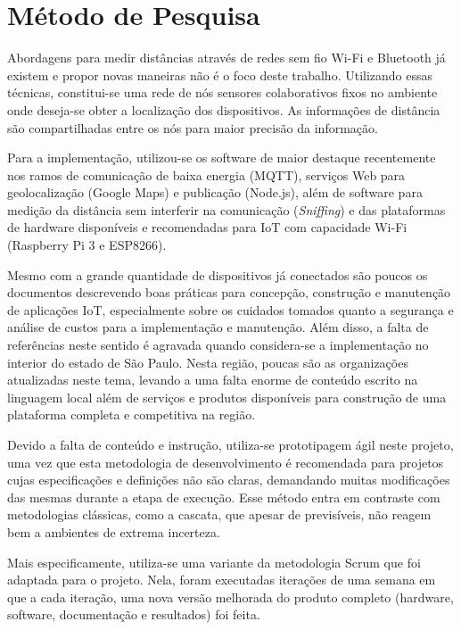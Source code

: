 \chapter{Método de Pesquisa}
\label{chap:Método de Pesquisa}

Abordagens para medir distâncias através de redes sem fio Wi-Fi
\cite{bahillo2009ieee} e Bluetooth já existem e propor novas maneiras
não é o foco deste trabalho. Utilizando essas técnicas, constitui-se uma
rede de nós sensores colaborativos fixos no ambiente onde deseja-se obter a
localização dos dispositivos. As informações de distância são compartilhadas
entre os nós para maior precisão da informação.

Para a implementação, utilizou-se os software de maior
destaque recentemente nos ramos de comunicação de baixa energia (MQTT),
serviços Web para geolocalização (Google Maps) e publicação
(Node.js), além de software para medição da distância sem
interferir na comunicação (\emph{Sniffing}) e das plataformas de
hardware disponíveis e recomendadas para IoT com capacidade
Wi-Fi (Raspberry Pi 3 e ESP8266).

Mesmo com a grande quantidade de dispositivos já conectados são poucos os
documentos descrevendo boas práticas para concepção, construção e manutenção de
aplicações IoT, especialmente sobre os cuidados tomados quanto a segurança e
análise de custos para a implementação e manutenção. Além
disso, a falta de referências neste sentido é agravada quando considera-se a
implementação no interior do estado de São Paulo. Nesta região, poucas são as
organizações atualizadas neste tema, levando a uma falta enorme de conteúdo
escrito na linguagem local além de serviços e produtos disponíveis para
construção de uma plataforma completa e competitiva na região.

Devido a falta de conteúdo e instrução, utiliza-se prototipagem ágil neste
projeto, uma vez que esta metodologia de desenvolvimento é recomendada para
projetos cujas especificações e definições não são claras, demandando muitas
modificações das mesmas durante a etapa de execução. Esse método entra em
contraste com metodologias clássicas, como a cascata, que apesar de previsíveis,
não reagem bem a ambientes de extrema incerteza.

Mais especificamente, utiliza-se uma variante da metodologia Scrum
\cite{James2016} que foi adaptada para o projeto. Nela, foram executadas
iterações de uma semana em que a cada iteração, uma nova versão melhorada do
produto completo (hardware, software, documentação e
resultados) foi feita.

